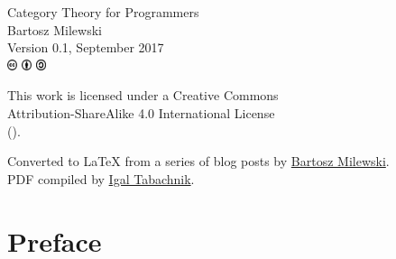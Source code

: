 \begin{small}
\begin{center}

\noindent
Category Theory for Programmers\\

\vspace{1.0em}
\noindent
Bartosz Milewski\\

\vspace{1.26em}
\noindent
Version 0.1, September 2017\\

\vspace{1.6em}
\noindent
\includegraphics[width=3mm]{fig/icons/cc.pdf}
\includegraphics[width=3mm]{fig/icons/by.pdf}
\includegraphics[width=3mm]{fig/icons/sa.pdf}

\vspace{0.4em}
\noindent
This work is licensed under a Creative Commons\\
Attribution-ShareAlike 4.0 International License\\
(\href{http://creativecommons.org/licenses/by-sa/4.0/}{}).

\vspace{1.26em}
\noindent
Converted to LaTeX from a series of blog posts by \href{https://bartoszmilewski.com/2014/10/28/category-theory-for-programmers-the-preface/}{Bartosz Milewski}.\\
PDF compiled by \href{https://github.com/hmemcpy/milewski-ctfp-pdf}{Igal Tabachnik}.\\

\end{center}
\end{small}

\pagebreak
\tableofcontents

\chapter*{Preface}
\label{Preface}



\mainmatter

